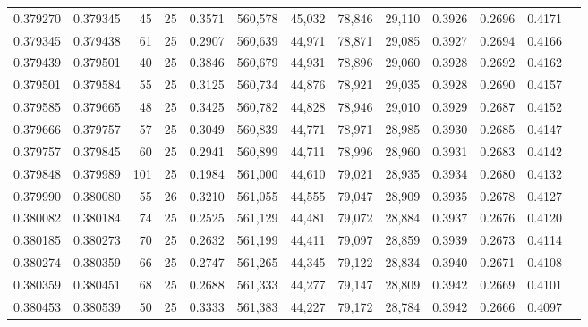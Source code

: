 \begin{tabular}{rrrrrrrrrrrrr}
0.379270 & 0.379345 &    45 &  25 &                                     0.3571 & 560,578 &  45,032 &  78,846 &  29,110 & 0.3926 & 0.2696 & 0.4171 \\
0.379345 & 0.379438 &    61 &  25 &                                     0.2907 & 560,639 &  44,971 &  78,871 &  29,085 & 0.3927 & 0.2694 & 0.4166 \\
0.379439 & 0.379501 &    40 &  25 &                                     0.3846 & 560,679 &  44,931 &  78,896 &  29,060 & 0.3928 & 0.2692 & 0.4162 \\
0.379501 & 0.379584 &    55 &  25 &                                     0.3125 & 560,734 &  44,876 &  78,921 &  29,035 & 0.3928 & 0.2690 & 0.4157 \\
0.379585 & 0.379665 &    48 &  25 &                                     0.3425 & 560,782 &  44,828 &  78,946 &  29,010 & 0.3929 & 0.2687 & 0.4152 \\
0.379666 & 0.379757 &    57 &  25 &                                     0.3049 & 560,839 &  44,771 &  78,971 &  28,985 & 0.3930 & 0.2685 & 0.4147 \\
0.379757 & 0.379845 &    60 &  25 &                                     0.2941 & 560,899 &  44,711 &  78,996 &  28,960 & 0.3931 & 0.2683 & 0.4142 \\
0.379848 & 0.379989 &   101 &  25 &                                     0.1984 & 561,000 &  44,610 &  79,021 &  28,935 & 0.3934 & 0.2680 & 0.4132 \\
0.379990 & 0.380080 &    55 &  26 &                                     0.3210 & 561,055 &  44,555 &  79,047 &  28,909 & 0.3935 & 0.2678 & 0.4127 \\
0.380082 & 0.380184 &    74 &  25 &                                     0.2525 & 561,129 &  44,481 &  79,072 &  28,884 & 0.3937 & 0.2676 & 0.4120 \\
0.380185 & 0.380273 &    70 &  25 &                                     0.2632 & 561,199 &  44,411 &  79,097 &  28,859 & 0.3939 & 0.2673 & 0.4114 \\
0.380274 & 0.380359 &    66 &  25 &                                     0.2747 & 561,265 &  44,345 &  79,122 &  28,834 & 0.3940 & 0.2671 & 0.4108 \\
0.380359 & 0.380451 &    68 &  25 &                                     0.2688 & 561,333 &  44,277 &  79,147 &  28,809 & 0.3942 & 0.2669 & 0.4101 \\
0.380453 & 0.380539 &    50 &  25 &                                     0.3333 & 561,383 &  44,227 &  79,172 &  28,784 & 0.3942 & 0.2666 & 0.4097 \\

\end{tabular}
